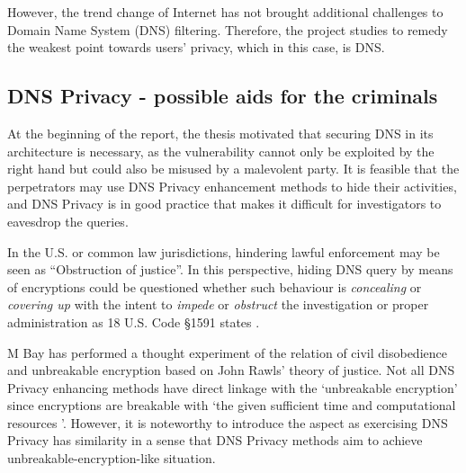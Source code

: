 However, the trend change of Internet has not brought additional challenges to Domain Name System (DNS) filtering. Therefore, the project studies to remedy the weakest point towards users' privacy, which in this case, is DNS.

\subsection{DNS Privacy - possible aids for the criminals}
At the beginning of the report, the thesis motivated that securing DNS in its architecture is necessary, as the vulnerability cannot only be exploited by the right hand but could also be misused by a malevolent party.
It is feasible that the perpetrators may use DNS Privacy enhancement methods to hide their activities, and DNS Privacy is in good practice that makes it difficult for investigators to eavesdrop the queries.

In the U.S. or common law jurisdictions, hindering lawful enforcement may be seen as ``Obstruction of justice''.
In this perspective, hiding DNS query by means of encryptions could be questioned whether such behaviour is \textit{concealing} or \textit{covering up} with the intent to \textit{impede} or \textit{obstruct} the investigation or proper administration as 18 U.S. Code \S 1591 states \cite{Obstructionofjustice}.

M Bay has performed a thought experiment of the relation of civil disobedience and unbreakable encryption \cite{bay2017ethics} based on John Rawls' theory of justice.
Not all DNS Privacy enhancing methods have direct linkage with the `unbreakable encryption' since encryptions are breakable with `the given sufficient time and computational resources \cite{ellison2000ten,chau2006application}'.
However, it is noteworthy to introduce the aspect as exercising DNS Privacy has similarity in a sense that DNS Privacy methods aim to achieve unbreakable-encryption-like situation.


